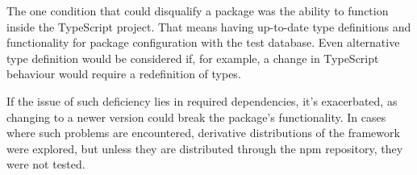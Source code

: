 The one condition that could disqualify a package was the ability to function
inside the TypeScript project. That means having up-to-date type definitions and
functionality for package configuration with the test database. Even alternative
type definition would be considered if, for example, a change in TypeScript
behaviour would require a redefinition of types.

If the issue of such deficiency lies in required dependencies, it's exacerbated,
as changing to a newer version could break the package's functionality. In cases
where such problems are encountered, derivative distributions of the framework
were explored, but unless they are distributed through the npm repository, they
were not tested.

